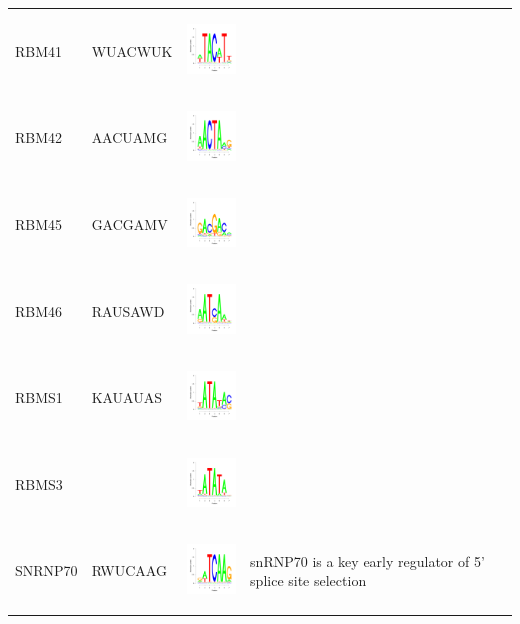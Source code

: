 \documentclass[a4paper,10pt]{article}
\begin{document}
\begin{center}
\begin{longtable}{|l|l|l|p{6cm}|}
RBM41 & WUACWUK & \includegraphics[height=0.8in]{./seqLogo/RBM41_wuacwuk.pdf}& \\   
RBM42 & AACUAMG & \includegraphics[height=0.8in]{./seqLogo/RBM42_aacuamg.pdf}& \\   
RBM45 & GACGAMV & \includegraphics[height=0.8in]{./seqLogo/RBM45_gacgamv.pdf} & \\   
RBM46 & RAUSAWD & \includegraphics[height=0.8in]{./seqLogo/RBM46_rausawd.pdf} & \\   
RBMS1  & KAUAUAS & \includegraphics[height=0.8in]{./seqLogo/RBMS1_kauauas.pdf}& \\
RBMS3 &   &\includegraphics[height=0.8in]{./seqLogo/RBMS3_hauaua.pdf} & \\
\hline
SNRNP70 &RWUCAAG  & \includegraphics[height=0.8in]{./seqLogo/SNRNP70_rwucaag.pdf} &  snRNP70 is a key early regulator of 5' splice site selection~\cite{Carlson2015}\\

\end{longtable}
\end{center}
\end{document}

